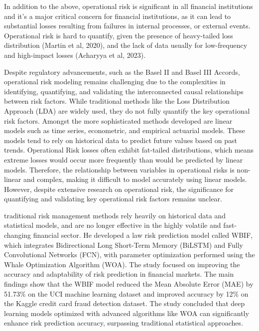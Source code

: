 In addition to the above, operational risk is significant in all financial institutions and it’s a major critical concern for financial institutions, as it can lead to substantial losses resulting from failures in internal processes, or external events. Operational risk is hard to quantify, given the presence of heavy-tailed loss distribution (Martin et al, 2020), and the lack of data usually for low-frequency and high-impact losses (Acharyya et al, 2023).

Despite regulatory advancements, such as the Basel II and Basel III Accords, operational risk modeling remains challenging due to the complexities in identifying, quantifying, and validating the interconnected causal relationships between risk factors. While traditional methods like the Loss Distribution Approach (LDA) are widely used, they do not fully quantify the key operational risk factors. Amongst the more sophisticated methods developed are linear models such as time series, econometric, and empirical actuarial models. These models tend to rely on historical data to predict future values based on past trends.  Operational Risk losses often exhibit fat-tailed distributions, which means extreme losses would occur more frequently than would be predicted by linear models. Therefore, the relationship between variables in operational risks is non-linear and complex, making it difficult to model accurately using linear models. However, despite extensive research on operational risk, the significance for quantifying and validating key operational risk factors remains unclear. 

\textcite{zhao_data_2024} traditional risk management methods rely heavily on historical data and statistical models, and are no longer effective in the highly volatile and fast-changing financial sector. He developed a law risk prediction model called WBIF, which integrates Bidirectional Long Short-Term Memory (BiLSTM) and Fully Convolutional Networks (FCN), with parameter optimization performed using the Whale Optimization Algorithm (WOA). The study focused on improving the accuracy and adaptability of risk prediction in financial markets. The main findings show that the WBIF model reduced the Mean Absolute Error (MAE) by 51.73\% on the UCI machine learning dataset and improved accuracy by 12\% on the Kaggle credit card fraud detection dataset. The study concluded that deep learning models optimized with advanced algorithms like WOA can significantly enhance risk prediction accuracy, surpassing traditional statistical approaches.

